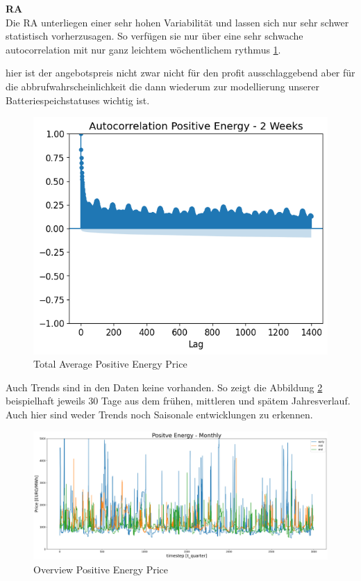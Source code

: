 \textbf{RA}\\
Die RA unterliegen einer sehr hohen Variabilität und lassen sich nur sehr schwer statistisch vorherzusagen. So
verfügen sie nur über eine sehr schwache autocorrelation mit nur ganz leichtem wöchentlichem rythmus \ref{fig:Autocorrelation Positive Energy Price}.

hier ist der angebotspreis nicht zwar nicht für den profit ausschlaggebend aber für die abbrufwahrscheinlichkeit
die dann wiederum zur modellierung unserer Batteriespeichstatuses wichtig ist.
\begin{figure}[!h]
	\includegraphics[width=1\linewidth]{pictures/Autocorrelation Positive Energy - 2 Weeks.png}
	\caption{Total Average Positive Energy Price}
	\label{fig:Autocorrelation Positive Energy Price}
\end{figure}

Auch Trends sind in den Daten keine vorhanden. So zeigt die Abbildung \ref{fig:posEngOverview} beispielhaft jeweils 30 Tage aus dem frühen, mittleren und spätem Jahresverlauf.
Auch hier sind weder Trends noch Saisonale entwicklungen zu erkennen.

\begin{figure}[!h]
	\includegraphics[width=1\linewidth]{pictures/posEngOverview.png}
	\caption{Overview Positive Energy Price}
	\label{fig:posEngOverview}
\end{figure}

